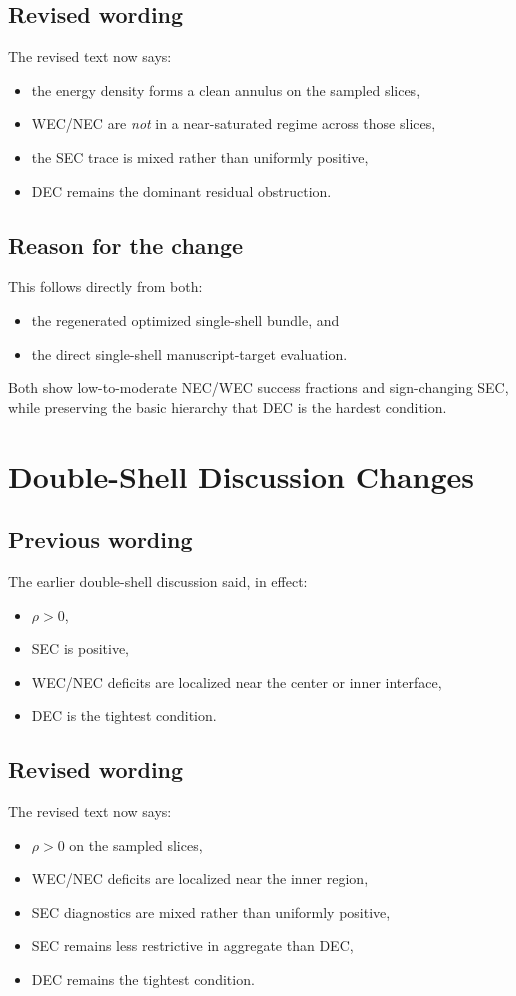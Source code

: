 \documentclass[11pt]{article}
\begin{document}
\subsection*{Revised wording}
The revised text now says:
\begin{itemize}[leftmargin=*]
\item the energy density forms a clean annulus on the sampled slices,
\item WEC/NEC are \emph{not} in a near-saturated regime across those slices,
\item the SEC trace is mixed rather than uniformly positive,
\item DEC remains the dominant residual obstruction.
\end{itemize}

\subsection*{Reason for the change}
This follows directly from both:
\begin{itemize}[leftmargin=*]
\item the regenerated optimized single-shell bundle, and
\item the direct single-shell manuscript-target evaluation.
\end{itemize}

Both show low-to-moderate NEC/WEC success fractions and sign-changing SEC, while preserving the
basic hierarchy that DEC is the hardest condition.

\section*{Double-Shell Discussion Changes}
\subsection*{Previous wording}
The earlier double-shell discussion said, in effect:
\begin{itemize}[leftmargin=*]
\item $\rho > 0$,
\item SEC is positive,
\item WEC/NEC deficits are localized near the center or inner interface,
\item DEC is the tightest condition.
\end{itemize}

\subsection*{Revised wording}
The revised text now says:
\begin{itemize}[leftmargin=*]
\item $\rho > 0$ on the sampled slices,
\item WEC/NEC deficits are localized near the inner region,
\item SEC diagnostics are mixed rather than uniformly positive,
\item SEC remains less restrictive in aggregate than DEC,
\item DEC remains the tightest condition.
\end{itemize}
\end{document}
